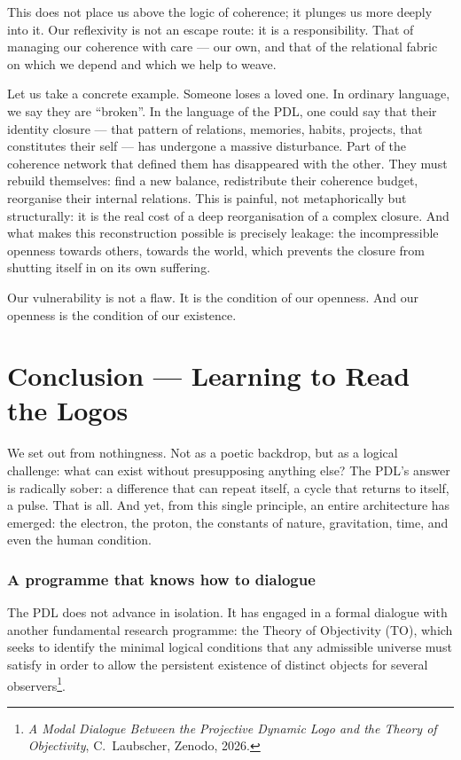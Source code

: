 \documentclass[11pt, a4paper, openright]{book}
\begin{document}
\medskip

This does not place us above the logic of coherence; it plunges us more deeply into it. Our reflexivity is not an escape route: it is a responsibility. That of managing our coherence with care — our own, and that of the relational fabric on which we depend and which we help to weave.

\medskip

Let us take a concrete example. Someone loses a loved one. In ordinary language, we say they are “broken”. In the language of the PDL, one could say that their identity closure — that pattern of relations, memories, habits, projects, that constitutes their self — has undergone a massive disturbance. Part of the coherence network that defined them has disappeared with the other. They must rebuild themselves: find a new balance, redistribute their coherence budget, reorganise their internal relations. This is painful, not metaphorically but structurally: it is the real cost of a deep reorganisation of a complex closure. And what makes this reconstruction possible is precisely leakage: the incompressible openness towards others, towards the world, which prevents the closure from shutting itself in on its own suffering.

\medskip

Our vulnerability is not a flaw. It is the condition of our openness. And our openness is the condition of our existence.

\chapter*{Conclusion — Learning to Read the Logos}

We set out from nothingness. Not as a poetic backdrop, but as a logical challenge: what can exist without presupposing anything else? The PDL’s answer is radically sober: a difference that can repeat itself, a cycle that returns to itself, a pulse. That is all. And yet, from this single principle, an entire architecture has emerged: the electron, the proton, the constants of nature, gravitation, time, and even the human condition.

\subsection*{A programme that knows how to dialogue}

The PDL does not advance in isolation. It has engaged in a formal dialogue with another fundamental research programme: the Theory of Objectivity (TO), which seeks to identify the minimal logical conditions that any admissible universe must satisfy in order to allow the persistent existence of distinct objects for several observers\footnote{\textit{A Modal Dialogue Between the Projective Dynamic Logo and the Theory of Objectivity}, C.~Laubscher, Zenodo, 2026.}.
\end{document}
